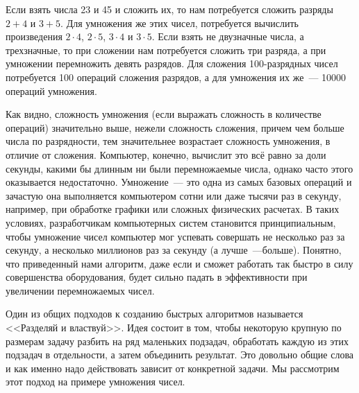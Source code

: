 Если взять числа 23 и 45 и сложить их, то нам потребуется сложить разряды $2+4$ и $3+5$. Для умножения же этих чисел, потребуется вычислить произведения $2\cdot 4$, $2\cdot 5$, $3\cdot 4$ и $3\cdot 5$. Если взять не двузначные числа, а трехзначные, то при сложении нам потребуется сложить три разряда, а при умножении перемножить девять разрядов. Для сложения 100-разрядных чисел потребуется 100 операций сложения разрядов, а для умножения их же~--- 10000 операций умножения.

Как видно, сложность умножения (если выражать сложность в количестве операций)  значительно выше, нежели сложность сложения, причем чем больше числа по разрядности, тем значительнее возрастает сложность умножения, в отличие от сложения. Компьютер, конечно, вычислит это всё равно за доли секунды, какими бы длинным ни были перемножаемые числа, однако часто этого оказывается недостаточно. Умножение~--- это одна из самых базовых операций и зачастую она выполняется компьютером сотни или даже тысячи раз в секунду, например, при обработке графики или сложных физических расчетах. В таких условиях, разработчикам компьютерных систем становится принципиальным, чтобы умножение чисел компьютер мог успевать совершать не несколько раз за секунду, а несколько миллионов раз за секунду (а лучше~---больше). Понятно, что приведенный нами алгоритм, даже если и сможет работать так быстро в силу совершенства оборудования, будет сильно падать в эффективности при увеличении перемножаемых чисел.

Один из общих подходов к созданию быстрых алгоритмов называется <<Разделяй и властвуй>>. Идея состоит в том, чтобы некоторую крупную по размерам задачу разбить на ряд маленьких подзадач, обработать каждую из этих подзадач в отдельности, а затем объединить результат. Это довольно общие слова и как именно надо действовать зависит от конкретной задачи. Мы рассмотрим этот подход на примере умножения чисел.


